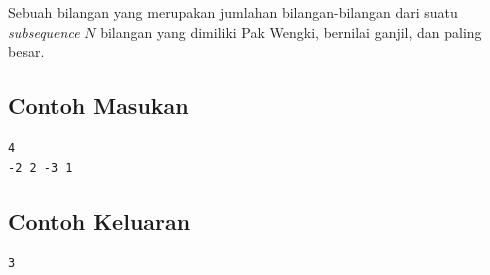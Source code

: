 \documentclass{article}
\begin{document}
Sebuah bilangan yang merupakan jumlahan bilangan-bilangan dari suatu \textit{subsequence} $N$ bilangan yang dimiliki Pak Wengki, bernilai ganjil, dan paling besar.
\\
\begin{multicols}{2}
\subsection*{Contoh Masukan}
\begin{lstlisting}
4
-2 2 -3 1
\end{lstlisting}
\columnbreak
\subsection*{Contoh Keluaran}
\begin{lstlisting}
3
\end{lstlisting}
\vfill
\null
\end{multicols}


\pagebreak
\end{document}
